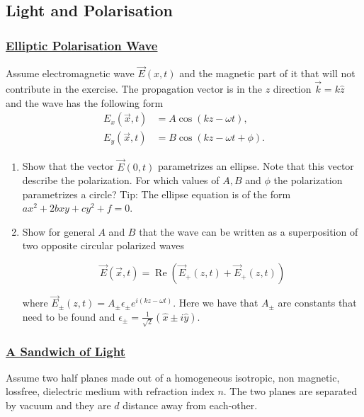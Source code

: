 \subsection{Light and Polarisation}

\subsubsection{\hyperref[EllipticPolarisationWave]{Elliptic Polarisation Wave}}

Assume electromagnetic wave $\vec{E}(x, t)$ and the magnetic part of it that will not contribute in the exercise. The propagation vector is in the $z$ direction $\vec{k}=k \hat{z}$ and the wave has the following form
\begin{subequations}
	\begin{align}
		E_{x}(\vec{x}, t)&=A \cos (k z-\omega t), \\
		E_{y}(\vec{x}, t)&=B \cos (k z-\omega t+\phi).
	\end{align}
\end{subequations}

\begin{enumerate}
	\item Show that the vector $\vec{E}(0, t)$ parametrizes an ellipse. Note that this vector describe the polarization. For which values of $A, B$ and $\phi$ the polarization parametrizes a circle? Tip: The ellipse equation is of the form $a x^{2}+2 b x y+c y^{2}+f=0$.
	\item Show for general $A$ and $B$ that the wave can be written as a superposition of two opposite circular polarized waves

	\begin{equation}
		\vec{E}(\vec{x}, t)=\operatorname{Re}\left(\vec{E}_{+}(z, t)+\vec{E}_{+}(z, t)\right)
	\end{equation}

	where $\vec{E}_{\pm}(z, t)=A_{\pm} \epsilon_{\pm} e^{i(k z-\omega t)}$. Here we have that $A_{\pm}$ are constants that need to be found and $\epsilon_{\pm}=\frac{1}{\sqrt{2}}(\hat{x} \pm i \hat{y}).$
\end{enumerate}

\subsubsection{\hyperref[ASandwichofLight]{A Sandwich of Light}}

Assume two half planes made out of a homogeneous isotropic, non magnetic, lossfree, dielectric medium with refraction index $n .$ The two planes are separated by vacuum and they are $d$ distance away from each-other.

